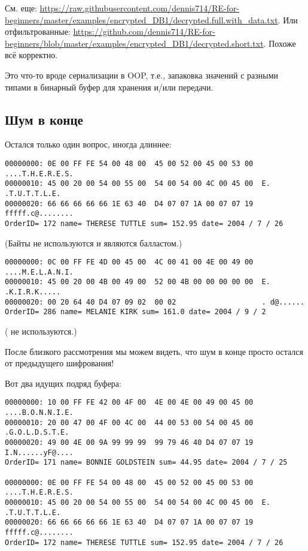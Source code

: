 См. еще: \url{https://raw.githubusercontent.com/dennis714/RE-for-beginners/master/examples/encrypted_DB1/decrypted.full.with_data.txt}.
Или отфильтрованные: \url{https://github.com/dennis714/RE-for-beginners/blob/master/examples/encrypted_DB1/decrypted.short.txt}.
Похоже всё корректно.

Это что-то вроде сериализации в \ac{OOP}, т.е., запаковка значений с разными типами в бинарный буфер для хранения и/или
передачи.

\subsection{Шум в конце}

Остался только один вопрос, иногда  длиннее:

\begin{lstlisting}
00000000: 0E 00 FF FE 54 00 48 00  45 00 52 00 45 00 53 00  ....T.H.E.R.E.S.
00000010: 45 00 20 00 54 00 55 00  54 00 54 00 4C 00 45 00  E. .T.U.T.T.L.E.
00000020: 66 66 66 66 66 1E 63 40  D4 07 07 1A 00 07 07 19  fffff.c@........
OrderID= 172 name= THERESE TUTTLE sum= 152.95 date= 2004 / 7 / 26
\end{lstlisting}

(Байты  не используются и являются балластом.)

\begin{lstlisting}
00000000: 0C 00 FF FE 4D 00 45 00  4C 00 41 00 4E 00 49 00  ....M.E.L.A.N.I.
00000010: 45 00 20 00 4B 00 49 00  52 00 4B 00 00 00 00 00  E. .K.I.R.K.....
00000020: 00 20 64 40 D4 07 09 02  00 02                    . d@......
OrderID= 286 name= MELANIE KIRK sum= 161.0 date= 2004 / 9 / 2
\end{lstlisting}

( не используются.)

После близкого рассмотрения мы можем видеть, что шум в конце  просто остался от предыдущего
шифрования!

Вот два идущих подряд буфера:

\begin{lstlisting}
00000000: 10 00 FF FE 42 00 4F 00  4E 00 4E 00 49 00 45 00  ....B.O.N.N.I.E.
00000010: 20 00 47 00 4F 00 4C 00  44 00 53 00 54 00 45 00   .G.O.L.D.S.T.E.
00000020: 49 00 4E 00 9A 99 99 99  99 79 46 40 D4 07 07 19  I.N......yF@....
OrderID= 171 name= BONNIE GOLDSTEIN sum= 44.95 date= 2004 / 7 / 25

00000000: 0E 00 FF FE 54 00 48 00  45 00 52 00 45 00 53 00  ....T.H.E.R.E.S.
00000010: 45 00 20 00 54 00 55 00  54 00 54 00 4C 00 45 00  E. .T.U.T.T.L.E.
00000020: 66 66 66 66 66 1E 63 40  D4 07 07 1A 00 07 07 19  fffff.c@........
OrderID= 172 name= THERESE TUTTLE sum= 152.95 date= 2004 / 7 / 26
\end{lstlisting}

